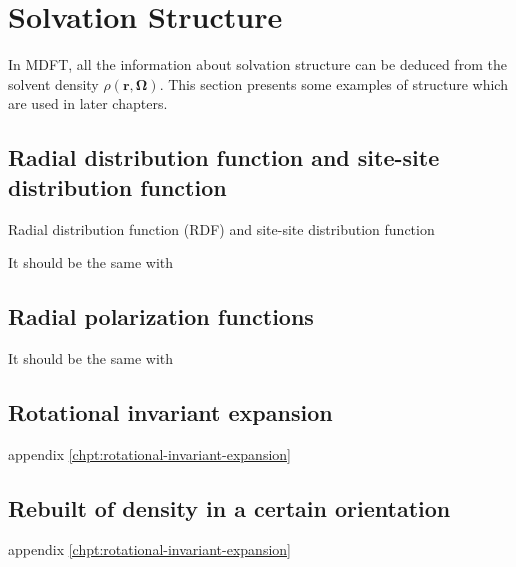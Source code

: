 
\chapter{Solvation Structure\label{chpt:solvation-structure}}

In MDFT, all the information about solvation structure can be deduced
from the solvent density $\rho(\mathbf{r},\mathbf{\Omega})$. This
section presents some examples of structure which are used in later
chapters.


\section{Radial distribution function and site-site distribution function}

Radial distribution function (\acs{RDF}) and site-site distribution
function

It should be the same with 


\section{Radial polarization functions}

It should be the same with 


\section{Rotational invariant expansion}

appendix \ref{chpt:rotational-invariant-expansion}


\section{Rebuilt of density in a certain orientation}

appendix \ref{chpt:rotational-invariant-expansion}
